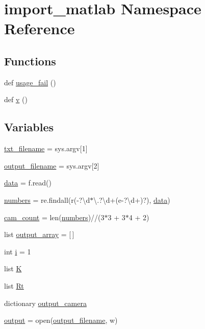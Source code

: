 \hypertarget{namespaceimport__matlab}{}\section{import\+\_\+matlab Namespace Reference}
\label{namespaceimport__matlab}
\subsection*{Functions}
\begin{DoxyCompactItemize}
\item 
def \hyperlink{namespaceimport__matlab_a8072dc5b88b2718c14efe0cd3033f397}{usage\+\_\+fail} ()
\item 
def \hyperlink{namespaceimport__matlab_a43c35054e148e026c772896fcf0ee506}{v} ()
\end{DoxyCompactItemize}
\subsection*{Variables}
\begin{DoxyCompactItemize}
\item 
\hyperlink{namespaceimport__matlab_a759337ff99df77b7e83b057fce792564}{txt\+\_\+filename} = sys.\+argv\mbox{[}1\mbox{]}
\item 
\hyperlink{namespaceimport__matlab_a51215342792268f23af9e7982d0569b7}{output\+\_\+filename} = sys.\+argv\mbox{[}2\mbox{]}
\item 
\hyperlink{namespaceimport__matlab_afe357346cb875eacc89e2820a1fa44ea}{data} = f.\+read()
\item 
\hyperlink{namespaceimport__matlab_ae6e8a21abac9a4c55a32dd4b2049fbf5}{numbers} = re.\+findall(r\textquotesingle{}(-\/?\textbackslash{}d$\ast$\textbackslash{}.?\textbackslash{}d+(e-\/?\textbackslash{}d+)?)\textquotesingle{}, \hyperlink{namespaceimport__matlab_afe357346cb875eacc89e2820a1fa44ea}{data})
\item 
\hyperlink{namespaceimport__matlab_a8982716ca70e72d99bdc65fbe0e2d827}{cam\+\_\+count} = len(\hyperlink{namespaceimport__matlab_ae6e8a21abac9a4c55a32dd4b2049fbf5}{numbers})//(3$\ast$3 + 3$\ast$4 + 2)
\item 
list \hyperlink{namespaceimport__matlab_a1260a243c2dd91664fa50ae9afef31bd}{output\+\_\+array} = \mbox{[}$\,$\mbox{]}
\item 
int \hyperlink{namespaceimport__matlab_aea76e0452b3fe0bf3b1340e4f2383a36}{i} = 1
\item 
list \hyperlink{namespaceimport__matlab_aabc884a43d7f54d120363b5b1f7aa797}{K}
\item 
list \hyperlink{namespaceimport__matlab_af35611fc15f922f0c3fde1ffb49832cd}{Rt}
\item 
dictionary \hyperlink{namespaceimport__matlab_a2396c58f5f7eff335900411b0fa50b3b}{output\+\_\+camera}
\item 
\hyperlink{namespaceimport__matlab_a06f190c191c2bbb695c9c7cb2f828c5a}{output} = open(\hyperlink{namespaceimport__matlab_a51215342792268f23af9e7982d0569b7}{output\+\_\+filename}, \textquotesingle{}w\textquotesingle{})
\end{DoxyCompactItemize}


